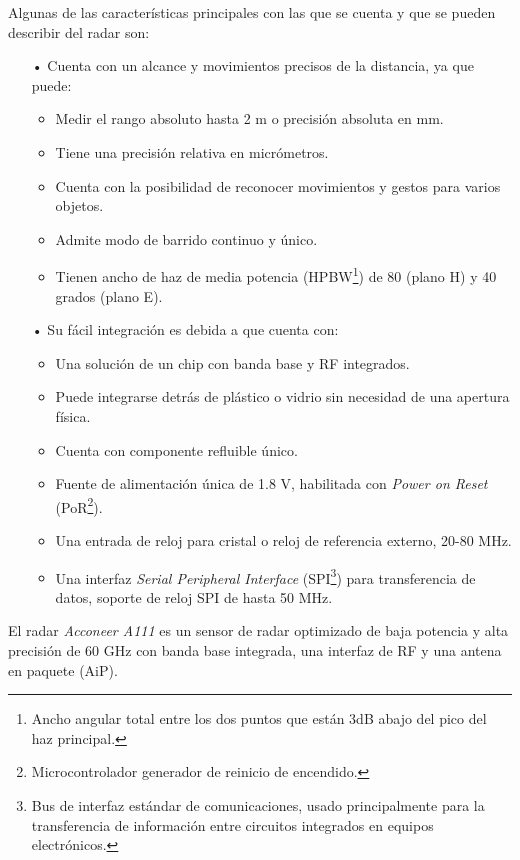Algunas de las características principales con las que se cuenta y que se pueden describir del radar son:

\begin{itemize}
    \item[•] Cuenta con un alcance y movimientos precisos de la distancia, ya que puede:
    \begin{itemize}
        \item Medir el rango absoluto hasta 2 m o precisión absoluta en mm.
		\item Tiene una precisión relativa en micrómetros.
		\item Cuenta con la posibilidad de reconocer movimientos y gestos para varios objetos.
		\item Admite modo de barrido continuo y único.
		\item Tienen ancho de haz de media potencia (HPBW\footnote{Ancho angular total entre los dos puntos que están 3dB abajo del pico del haz principal.}) de 80 (plano H) y 40 grados (plano E).
    \end{itemize}
    \item[•] Su fácil integración es debida a que cuenta con:
    \begin{itemize}
        \item Una solución de un chip con banda base y RF integrados.
		\item Puede integrarse detrás de plástico o vidrio sin necesidad de una apertura física.
		\item Cuenta con componente refluible único.
		\item Fuente de alimentación única de 1.8 V, habilitada con \textit{Power on Reset} (PoR\footnote{Microcontrolador generador de reinicio de encendido.}).
		\item Una entrada de reloj para cristal o reloj de referencia externo, 20-80 MHz.
		\item Una interfaz \textit{Serial Peripheral Interface} (SPI\footnote{Bus de interfaz estándar de comunicaciones, usado principalmente para la transferencia de información entre circuitos integrados en equipos electrónicos.}) para transferencia de datos, soporte de reloj SPI de hasta 50 MHz.
    \end{itemize}
\end{itemize}

El radar \textit{Acconeer A111} es un sensor de radar optimizado de baja potencia y alta precisión de 60 GHz con banda base integrada, una interfaz de RF y una antena en paquete (AiP).


